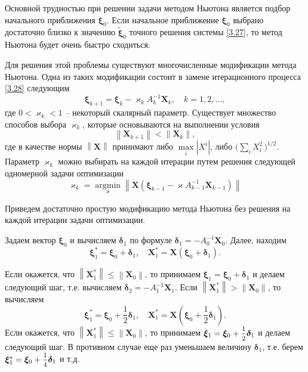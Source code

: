 \documentclass[a4paper,12pt, openany]{book}
\theoremstyle{plain} %
\theoremstyle{definition} %
\theoremstyle{remark} %
\numberwithin{equation}{chapter}
\begin{document}
{Основной трудностью при решении задачи методом Ньютона является подбор начального приближения $\bm\xi_0$. Если начальное приближение $\bm\xi_0$ выбрано достаточно близко к значению $\tilde{\bm\xi}_0$ точного решения системы \eqref{3.27}, то метод Ньютона будет очень быстро сходиться.  

Для решения этой проблемы существуют многочисленные модификации метода Ньютона. Одна из таких модификации состоит в замене итерационного процесса \eqref{3.28} следующим
\begin{equation}\label{3.34}
\bm\xi _{k + 1}  = \bm\xi _k  - \varkappa _k A_k^{ - 1} \bm X_k , \quad k = 1,2, \ldots ,
\end{equation}
где $0<\varkappa_k < 1$ -- некоторый скалярный параметр. Существует множество способов выбора $\varkappa_k$, которые основываются на выполнении условия
\[
\left\| {\bm X_{k + 1} } \right\| < \left\| {\bm X_k } \right\|,
\]
где в качестве нормы $\left\|\bm X\right\|$ принимают либо $
\mathop {\max }\limits_i \left| {X^i } \right|
$, либо $
\big( {\sum\limits_i {X_i^2 } } \, \big)^{1/2} 
$. Параметр $\varkappa_k$ можно выбирать на каждой итерации путем решения следующей одномерной задачи оптимизации
\begin{equation}\label{3.35}
\varkappa _k  = \mathop {\mathrm{argmin}}\limits_\varkappa  \left\| {\bm X\left( {\bm\xi _{k - 1}  - \varkappa A_{k - 1}^{ - 1} \bm X_{k - 1} } \right)} \right\|
\end{equation}

Приведем достаточно простую модификацию метода Ньютона без решения на каждой итерации задачи оптимизации. 

Задаем вектор $\bm\xi_0$ и вычисляем $\bm\delta_1$ по формуле $\bm\delta_1 = -A_0^{-1}\bm X_0$. Далее, находим
\[
\bm\xi _1^*  = \bm\xi _0  + \bm\delta _1 ,\quad \bm X_1^*  = \bm X\left( {\bm\xi _0  + \bm\delta _1 } \right).
\]

Если окажется, что $
\left\| {\bm X_1^* } \right\| \leqslant \left\| {\bm X_0 } \right\|
$, то принимаем $\bm\xi_1 = \bm\xi_0 +\bm\delta_1$ и делаем следующий шаг, т.е. вычисляем $\bm\delta_2 = -A_1^{-1}\bm X_1$. Если $
\left\| {\bm X_1^* } \right\| > \left\| {\bm X_0 } \right\|$, то вычисляем
\[
\bm\xi _1^*  = \bm\xi _0  + \frac{1}
{2}\bm\delta _1 ,\quad \bm X_1^*  = \bm X\left( {\bm\xi _0  + \frac{1}
{2}\bm\delta _1 } \right).
\]
Если окажется, что 
$\left\| {\bm X_1^* } \right\| \leqslant \left\| {\bm X_0 } \right\|
$, то принимаем $\bm\xi_1 = \bm\xi_0 + \mfrac{1}{2}\bm\delta_1$ и делаем следующий шаг. В противном случае еще раз уменьшаем величину $\bm\delta_1$, т.е. берем $\bm\xi _1^*  = \bm\xi _0  + \mfrac{1}
{4}\bm\delta _1$ и т.д.

}
\end{document}
